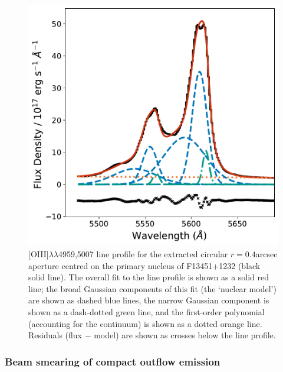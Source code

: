 \begin{figure}[!ht]
    \centering
    \includegraphics[width=0.7\linewidth]{figures/muse_f13451_1232/nuclear_model.pdf}
    \caption[{[}OIII{]}$\lambda\lambda$4959,5007 line profile (and nuclear model fit) for the primary nucleus of F13451+1232]{[OIII]$\lambda\lambda$4959,5007 line profile for the extracted circular $r=0.4$\;arcsec aperture centred on the primary nucleus of F13451+1232 (black solid line). The overall fit to the line profile is shown as a solid red line; the broad Gaussian components of this fit (the `nuclear model') are shown as dashed blue lines, the narrow Gaussian component is shown as a dash-dotted green line, and the first-order polynomial (accounting for the continuum) is shown as a dotted orange line. Residuals (flux $-$ model) are shown as crosses below the line profile.}
    \label{fig: muse_f13451_1232: analysis_and_results: seeing: nuclear_aperture_spectrum}
\end{figure}

\subsubsection{Beam smearing of compact outflow emission}
\label{section: muse_f13451_1232: analysis_and_results: seeing: psf}

